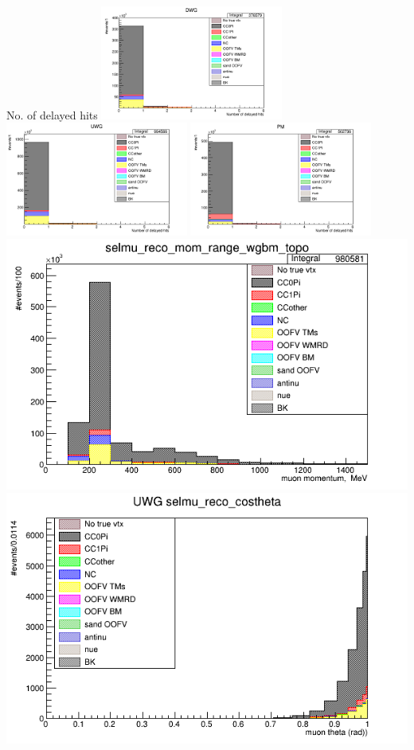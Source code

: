 \documentclass[%
 reprint,
 amsmath,amssymb,
 aps,
]{revtex4-2}
\begin{document}
\begin{frame}{No. of delayed hits}
    \includegraphics[width=0.45\textwidth]{images/num_reco_delayed_hits_wgbm_topo_DWG_accum_level[][26]_data_mc.png}
    \includegraphics[width=0.45\textwidth]{images/num_reco_delayed_hits_wgbm_topo_UWG_accum_level[][16]_data_mc.png}
    \includegraphics[width=0.45\textwidth]{images/num_reco_delayed_hits_wgbm_topo_PM_accum_level[][06]_data_mc.png}
\includegraphics[width=.45\textwidth]{images/selmu_reco_mom_range_UWG_wgbm_topo_accum_level[][16]_data_mc.png}
\includegraphics[width=.45\textwidth]{images/selmu_reco_costheta_wgbm_topo_UWG_accum_level[][16]_data_mc.png}
\end{frame}
\end{document}
